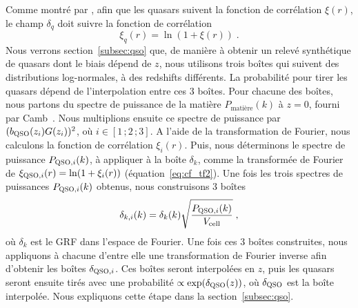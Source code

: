 Comme montré par \textcite{coles_lognormal_1991}, afin que les quasars suivent la fonction de corrélation $\xi(r)$, le champ $\delta_q$ doit suivre la fonction de corrélation 
\begin{equation}
  \label{eq:lognormal}
  \xi_q(r) = \ln(1+\xi(r)) \; .
\end{equation}
Nous verrons section~\ref{subsec:qso} que, de manière à obtenir un relevé synthétique de quasars dont le biais dépend de $z$, nous utilisons trois boîtes qui suivent des distributions log-normales, à des redshifts différents. La probabilité pour tirer les quasars dépend de l'interpolation entre ces 3 boîtes.
Pour chacune des boîtes, nous partons du spectre de puissance de la matière $P_{\mathrm{matière}}(k)$ à $z=0$, fourni par Camb~\autocite{Lewis1999}. Nous multiplions ensuite ce spectre de puissance par $(b_{\textsc{QSO}}(z_i) G(z_i))^2$, où $i \in [1\, ; 2\, ; 3]$. A l'aide de la transformation de Fourier, nous calculons la fonction de corrélation $\xi_{i}(r)$. Puis, nous déterminons le spectre de puissance $P_{\textsc{QSO},i}(k)$, à appliquer à la boîte $\delta_k$, comme la transformée de Fourier de $\xi_{\textsc{QSO},i}(r) = \ln(1+\xi_i(r))$ (équation~\ref{eq:cf_tf2}).
Une fois les trois spectres de puissances $P_{\textsc{QSO},i}(k)$ obtenus, nous construisons 3 boîtes
\begin{equation}
  \delta_{k,i}(k)  = \delta_k(k) \sqrt{\frac{P_{\textsc{QSO},i}(k)}{V_{\mathrm{cell}}}} \; ,
\end{equation}
où $\delta_k$ est le GRF dans l'espace de Fourier. Une fois ces 3 boîtes construites, nous appliquons à chacune d'entre elle une transformation de Fourier inverse afin d'obtenir les boîtes $\delta_{\textsc{QSO}, i}$. Ces boîtes seront interpolées en $z$, puis les quasars seront ensuite tirés avec une probabilité $\propto \exp(\delta_{\textsc{QSO}}(z))$, où $\delta_{\textsc{QSO}}$ est la boîte interpolée. Nous expliquons cette étape dans la section~\ref{subsec:qso}.


